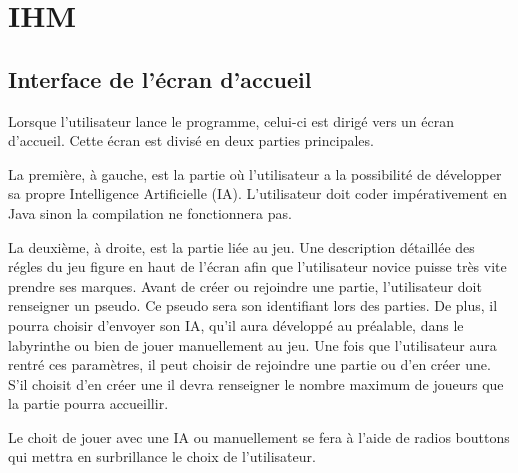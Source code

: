 \chapter{IHM}

\section{Interface de l'écran d'accueil}
	Lorsque l'utilisateur lance le programme, celui-ci est dirigé vers un écran d'accueil. Cette écran est divisé en deux parties principales.

	La première, à gauche, est la partie où l'utilisateur a la possibilité de développer sa propre Intelligence Artificielle (IA). L'utilisateur doit coder impérativement en Java sinon la compilation ne fonctionnera pas.

	La deuxième, à droite, est la partie liée au jeu. Une description détaillée des régles du jeu figure en haut de l'écran afin que l'utilisateur novice puisse très vite prendre ses marques. Avant de créer ou rejoindre une partie, l'utilisateur doit renseigner un pseudo. Ce pseudo sera son identifiant lors des parties. De plus, il pourra choisir d'envoyer son IA, qu'il aura développé au préalable, dans le labyrinthe ou bien de jouer manuellement au jeu. Une fois que l'utilisateur aura rentré ces paramètres, il peut choisir de rejoindre une partie ou d'en créer une. S'il choisit d'en créer une il devra renseigner le nombre maximum de joueurs que la partie pourra accueillir.

	Le choit de jouer avec une IA ou manuellement se fera à l'aide de radios bouttons qui mettra en surbrillance le choix de l'utilisateur.

